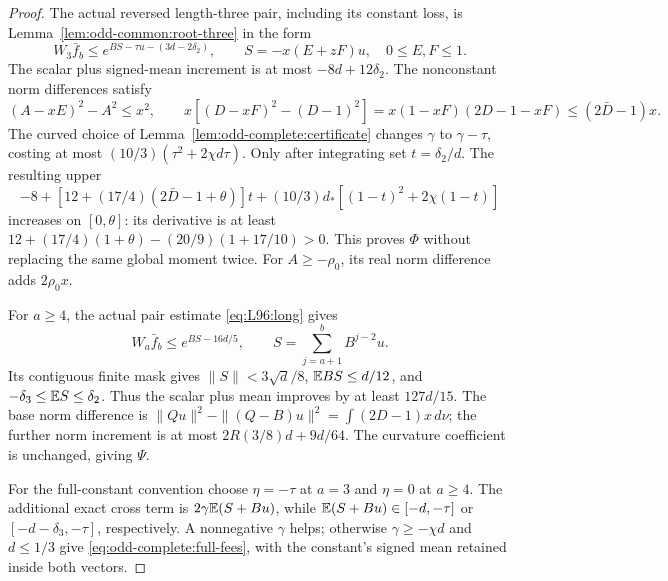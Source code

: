 \begin{proof}
The actual reversed length-three pair, including its constant loss,
is Lemma~\ref{lem:odd-common:root-three} in the form
\[
 W_3\bar f_b\le e^{BS-\tau u-(3d-2\delta_2)},\qquad
 S=-x(E+zF)u,
 \quad0\le E,F\le1.
\]
The scalar plus signed-mean increment is at most
$-8d+12\delta_2$. The nonconstant norm differences satisfy
\[
 (A-xE)^2-A^2\le x^2,
 \qquad
 x[(D-xF)^2-(D-1)^2]
   =x(1-xF)(2D-1-xF)\le(2\bar D-1)x.
\]
The curved choice of Lemma~\ref{lem:odd-complete:certificate}
changes $\gamma$ to $\gamma-\tau$, costing at most
$(10/3)(\tau^2+2\chi d\tau)$.
Only after integrating set $t=\delta_2/d$. The resulting upper
\[
 -8+[12+(17/4)(2\bar D-1+\theta)]t
       +(10/3)d_*[(1-t)^2+2\chi(1-t)]
\]
increases on $[0,\theta]$: its derivative is at least
$12+(17/4)(1+\theta)-(20/9)(1+17/10)>0$.
This proves $\Phi$ without replacing the same global moment twice.
For $A\ge-\rho_0$, its real norm difference adds $2\rho_0x$.

For $a\ge4$, the actual pair estimate \eqref{eq:L96:long} gives
\[
 W_a\bar f_b\le e^{BS-16d/5},\qquad
 S=\sum_{j=a+1}^{b}B^{j-2}u.
\]
Its contiguous finite mask gives
$\|S\|<3\sqrt d/8$, $\mathbb E BS\le d/12$, and
$-\delta_3\le\mathbb E S\le\delta_2$.
Thus the scalar plus mean improves by at least $127d/15$.
The base norm difference is
$\|Qu\|^2-\|(Q-B)u\|^2=\int(2D-1)x\,d\nu$;
the further norm increment is at most
$2R(3/8)d+9d/64$. The curvature coefficient is unchanged,
giving $\Psi$.

For the full-constant convention choose $\eta=-\tau$ at $a=3$
and $\eta=0$ at $a\ge4$. The additional exact cross term is
$2\gamma\mathbb E(S+Bu)$, while
$\mathbb E(S+Bu)\in[-d,-\tau]$ or
$[-d-\delta_3,-\tau]$, respectively. A nonnegative $\gamma$
helps; otherwise $\gamma\ge-\chi d$ and $d\le1/3$ give
\eqref{eq:odd-complete:full-fees}, with the constant's signed mean
retained inside both vectors.
\end{proof}

